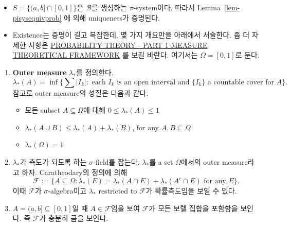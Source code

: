 \documentclass[
  letterpaper,
  DIV=11,
  numbers=noendperiod]{scrreprt}
\providecommand{\tightlist}{%
  \setlength{\itemsep}{0pt}\setlength{\parskip}{0pt}}
\theoremstyle{definition}
\theoremstyle{plain}
\theoremstyle{plain}
\theoremstyle{definition}
\theoremstyle{plain}
\theoremstyle{definition}
\theoremstyle{remark}
\begin{document}
\begin{tcolorbox}[enhanced jigsaw, left=2mm, arc=.35mm, leftrule=.75mm, colback=white, title=\textcolor{quarto-callout-note-color}{\faInfo}\hspace{0.5em}{Proof}, rightrule=.15mm, breakable, bottomrule=.15mm, coltitle=black, opacitybacktitle=0.6, opacityback=0, toptitle=1mm, titlerule=0mm, toprule=.15mm, colbacktitle=quarto-callout-note-color!10!white, bottomtitle=1mm, colframe=quarto-callout-note-color-frame]

\begin{itemize}
\item
  \(S = \{ (a,b] \cap [0,1]\}\)은 \(\mathcal{B}\)를 생성하는
  \(\pi\)-system이다. 따라서 Lemma~\ref{lem-pisysequivprob} 에 의해
  uniqueness가 증명된다.
\item
  Existence는 증명이 길고 복잡한데, 몇 가지 개요만을 아래에서 서술한다.
  좀 더 자세한 사항은
  \href{https://math.iisc.ac.in/~manju/PT2019/Lectures-part1.pdf}{PROBABILITY
  THEORY - PART 1 MEASURE THEORETICAL FRAMEWORK} 를 보길 바란다.
  여기서는 \(\Omega = [0,1]\)로 둔다.
\end{itemize}

\end{tcolorbox}

\begin{enumerate}
\def\labelenumi{\arabic{enumi}.}
\item
  \textbf{Outer measure} \(\lambda_{*}\)를 정의한다. \[
  \lambda_{*}(A) = \inf \{ \sum \vert I_k \vert : \text{ each }I_k \text{ is an open interval and } \{I_k\} \text{ a countable cover for } A \}.
  \] 참고로 outer measure의 성질은 다음과 같다.

  \begin{itemize}
  \tightlist
  \item
    모든 subset \(A\subseteq \Omega\)에 대해
    \(0\leq \lambda_{*}(A) \leq 1\)
  \item
    \(\lambda_{*}(A\cup B) \leq \lambda_{*}(A) + \lambda_{*}(B)\), for
    any \(A, B \subseteq \Omega\)
  \item
    \(\lambda_{*}(\Omega)=1\)
  \end{itemize}
\item
  \(\lambda_{*}\)가 측도가 되도록 하는 \(\sigma\)-field를 잡는다.
  \(\lambda_{*}\)를 a set \(\Omega\)에서의 outer measure라고 하자.
  Caratheodary의 정의에 의해 \[
  \mathcal{F}:= \{ A\subseteq \Omega : \lambda_{*}(E) = \lambda_{*}(A\cap E) + \lambda_{*}(A^c \cap E) \text{ for any } E\}.
  \] 이때 \(\mathcal{F}\)가 \(\sigma\)-algebra이고 \(\lambda_{*}\)
  restricted to \(\mathcal{F}\)가 확률측도임을 보일 수 있다.
\item
  \(A= (a,b]\subseteq [0,1]\)일 때 \(A\in \mathcal{F}\)임을 보여
  \(\mathcal{F}\)가 모든 보렐 집합을 포함함을 보인다. 즉
  \(\mathcal{F}\)가 충분히 큼을 보인다.
\end{enumerate}
\end{document}
